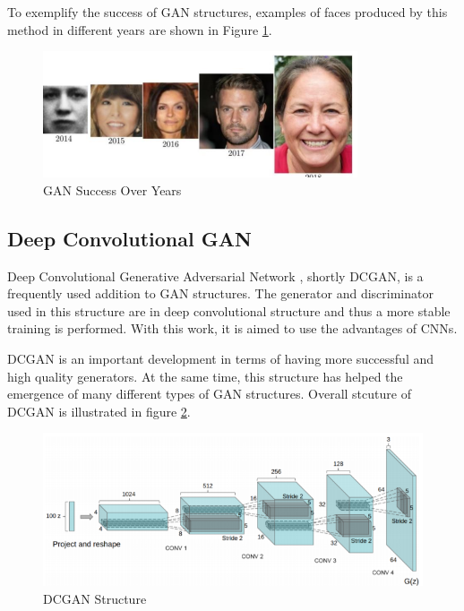 To exemplify the success of GAN structures, examples of faces produced by this method in different years are shown in Figure \ref{fig:gan-success}.

\begin{figure}[h!]
    \centering
    \includegraphics{figures/chapter3/gan-success-over-years.png}
    \vspace*{3mm}
    \caption{GAN Success Over Years \cite{ganoverview}}
    \label{fig:gan-success}
\end{figure}

\subsection{Deep Convolutional GAN}

Deep Convolutional Generative Adversarial Network \cite{dcgan}, shortly DCGAN, is a frequently used addition to GAN structures. The generator and discriminator used in this structure are in deep convolutional structure and thus a more stable training is performed. With this work, it is aimed to use the advantages of CNNs.

DCGAN is an important development in terms of having more successful and high quality generators. At the same time, this structure has helped the emergence of many different types of GAN structures. Overall stcuture of DCGAN is illustrated in figure \ref{fig:dcgan}.

\begin{figure}[h!]
    \centering
    \includegraphics[scale=0.8]{figures/chapter3/dc-gan-structure.png}
    \caption{DCGAN Structure \cite{dcgan}}
    \label{fig:dcgan}
\end{figure}
\newpage
